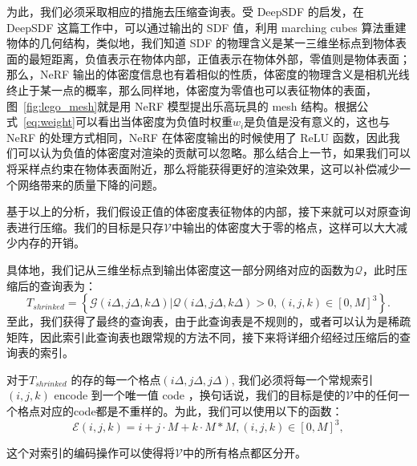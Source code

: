 为此，我们必须采取相应的措施去压缩查询表。受 DeepSDF \cite{park2019deepsdf}的启发，在 DeepSDF 这篇工作中，可以通过输出的 SDF 值，利用 marching cubes 算法\cite{lorensen1987marching}重建物体的几何结构，类似地，我们知道 SDF 的物理含义是某一三维坐标点到物体表面的最短距离，负值表示在物体内部，正值表示在物体外部，零值则是物体表面；那么，NeRF 输出的体密度信息也有着相似的性质，体密度的物理含义是相机光线终止于某一点的概率，那么同样地，体密度为零值也可以表征物体的表面， 图~\ref{fig:lego_mesh}就是用 NeRF 模型提出乐高玩具的 mesh 结构。根据公式~\ref{eq:weight}可以看出当体密度为负值时权重$w_i$是负值是没有意义的，这也与 NeRF 的处理方式相同，NeRF 在体密度输出的时候使用了 ReLU 函数，因此我们可以认为负值的体密度对渲染的贡献可以忽略。那么结合上一节，如果我们可以将采样点约束在物体表面附近，那么将能获得更好的渲染效果，这可以补偿减少一个网络带来的质量下降的问题。

基于以上的分析，我们假设正值的体密度表征物体的内部，接下来就可以对原查询表进行压缩。我们的目标是只存$\mathcal{V}$中输出的体密度大于零的格点，这样可以大大减少内存的开销。

具体地，我们记从三维坐标点到输出体密度这一部分网络对应的函数为$\mathcal{Q}$，此时压缩后的查询表为：
\begin{equation}
    T_{shrinked} = \left\{
    \mathcal{G}\left(i\Delta, j\Delta, k\Delta\right) | \mathcal{Q}\left(i\Delta, j\Delta, k\Delta \right)  > 0, \left(i, j, k\right) \in \left[0, M\right]^3 
    \right\}.
\end{equation}
至此，我们获得了最终的查询表，由于此查询表是不规则的，或者可以认为是稀疏矩阵，因此索引此查询表也跟常规的方法不同，接下来将详细介绍经过压缩后的查询表的索引。

对于$ T_{shrinked}$ 的存的每一个格点$\left(i\Delta, j\Delta, j\Delta\right)$, 我们必须将每一个常规索引$\left(i, j, k\right)$ encode 到一个唯一值 code ，换句话说，我们的目标是使的$\mathcal{V}$中的任何一个格点对应的code都是不重样的。为此，我们可以使用以下的函数：
\begin{equation}
    \mathcal{E}\left(i, j, k\right) = i + j\cdot M + k\cdot M * M, \left(i, j, k\right) \in \left[0, M\right]^3,
\end{equation}

这个对索引的编码操作可以使得将$\mathcal{V}$中的所有格点都区分开。

